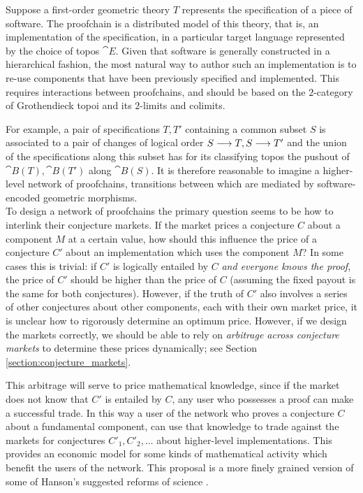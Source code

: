 \documentclass[english,letter paper,12pt,reqno]{article}
\theoremstyle{example}
\newtheorem{problem}[theorem]{Open problem}
\begin{document}
Suppose a first-order geometric theory $T$ represents the specification of a piece of software. The proofchain is a distributed model of this theory, that is, an implementation of the specification, in a particular target language represented by the choice of topos $\cat{E}$. Given that software is generally constructed in a hierarchical fashion, the most natural way to author such an implementation is to re-use components that have been previously specified and implemented. This requires interactions between proofchains, and should be based on the $2$-category of Grothendieck topoi and its $2$-limits and colimits.

For example, a pair of specifications $T,T'$ containing a common subset $S$ is associated to a pair of changes of logical order $S \longrightarrow T, S \longrightarrow T'$ and the union of the specifications along this subset has for its classifying topos the pushout of $\cat{B}(T), \cat{B}(T')$ along $\cat{B}(S)$. It is therefore reasonable to imagine a higher-level network of proofchains, transitions between which are mediated by software-encoded geometric morphisms. %
\\


To design a network of proofchains the primary question seems to be how to interlink their conjecture markets. If the market prices a conjecture $C$ about a component $M$ at a certain value, how should this influence the price of a conjecture $C'$ about an implementation which uses the component $M$? In some cases this is trivial: if $C'$ is logically entailed by $C$ \emph{and everyone knows the proof}, the price of $C'$ should be higher than the price of $C$ (assuming the fixed payout is the same for both conjectures). However, if the truth of $C'$ also involves a series of other conjectures about other components, each with their own market price, it is unclear how to rigorously determine an optimum price. However, if we design the markets correctly, we should be able to rely on \emph{arbitrage across conjecture markets} to determine these prices dynamically; see Section \ref{section:conjecture_markets}.

This arbitrage will serve to price mathematical knowledge, since if the market does not know that $C'$ is entailed by $C$, any user who possesses a proof can make a successful trade. In this way a user of the network who proves a conjecture $C$ about a fundamental component, can use that knowledge to trade against the markets for conjectures $C'_1,C'_2,\ldots$ about higher-level implementations. This provides an economic model for some kinds of mathematical activity which benefit the users of the network. This proposal is a more finely grained version of some of Hanson's suggested reforms of science \cite{hanson1,hanson2}.
\end{document}

